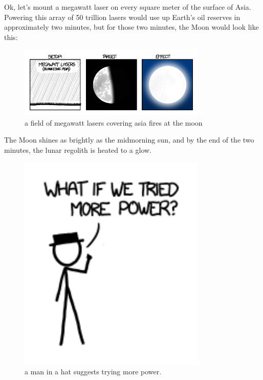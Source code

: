 {Ok, let’s mount a megawatt laser on every square meter of the surface of Asia. Powering this array of 50 trillion lasers would use up Earth’s oil reserves in approximately two minutes, but for those two minutes, the Moon would look like this:}

\begin{figure}[!htbp]
\centering
\includegraphics[scale=0.5, max width=0.8\textwidth]{imgs/a/13/laser_pointer_megawatt_asia.png}
\caption{a field of megawatt lasers covering asia fires at the moon}
\end{figure}

{The Moon shines as brightly as the midmorning sun, and by the end of the two minutes, the lunar regolith is heated to a glow.}

\begin{figure}[!htbp]
\centering
\includegraphics[scale=0.5, max width=0.8\textwidth]{imgs/a/13/laser_pointer_more_power.png}
\caption{a man in a hat suggests trying more power.}
\end{figure}

